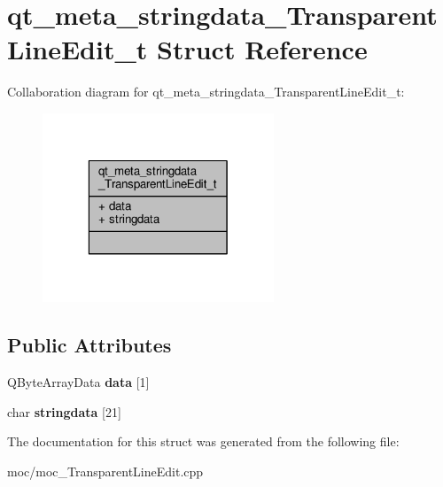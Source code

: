 \hypertarget{structqt__meta__stringdata___transparent_line_edit__t}{\section{qt\-\_\-meta\-\_\-stringdata\-\_\-\-Transparent\-Line\-Edit\-\_\-t Struct Reference}
\label{structqt__meta__stringdata___transparent_line_edit__t}
}


Collaboration diagram for qt\-\_\-meta\-\_\-stringdata\-\_\-\-Transparent\-Line\-Edit\-\_\-t\-:
\nopagebreak
\begin{figure}[H]
\begin{center}
\leavevmode
\includegraphics[width=196pt]{structqt__meta__stringdata___transparent_line_edit__t__coll__graph}
\end{center}
\end{figure}
\subsection*{Public Attributes}
\begin{DoxyCompactItemize}
\item 
\hypertarget{structqt__meta__stringdata___transparent_line_edit__t_aaa94e7c77d8832577a3c1633dc79fe80}{Q\-Byte\-Array\-Data {\bfseries data} \mbox{[}1\mbox{]}}\label{structqt__meta__stringdata___transparent_line_edit__t_aaa94e7c77d8832577a3c1633dc79fe80}

\item 
\hypertarget{structqt__meta__stringdata___transparent_line_edit__t_aca6a723f6999ecf919421d560da4ff8f}{char {\bfseries stringdata} \mbox{[}21\mbox{]}}\label{structqt__meta__stringdata___transparent_line_edit__t_aca6a723f6999ecf919421d560da4ff8f}

\end{DoxyCompactItemize}


The documentation for this struct was generated from the following file\-:\begin{DoxyCompactItemize}
\item 
moc/moc\-\_\-\-Transparent\-Line\-Edit.\-cpp\end{DoxyCompactItemize}
